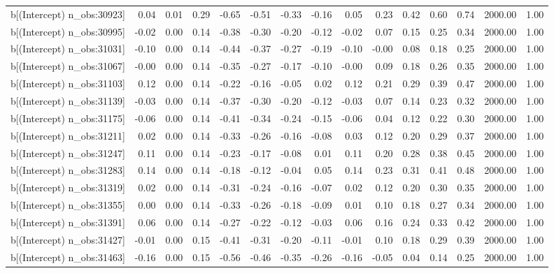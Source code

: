 \begin{table}[ht]
\begin{tabular}{rrrrrrrrrrrrrrr}
  b[(Intercept) n\_obs:30923] & 0.04 & 0.01 & 0.29 & -0.65 & -0.51 & -0.33 & -0.16 & 0.05 & 0.23 & 0.42 & 0.60 & 0.74 & 2000.00 & 1.00 \\ 
  b[(Intercept) n\_obs:30995] & -0.02 & 0.00 & 0.14 & -0.38 & -0.30 & -0.20 & -0.12 & -0.02 & 0.07 & 0.15 & 0.25 & 0.34 & 2000.00 & 1.00 \\ 
  b[(Intercept) n\_obs:31031] & -0.10 & 0.00 & 0.14 & -0.44 & -0.37 & -0.27 & -0.19 & -0.10 & -0.00 & 0.08 & 0.18 & 0.25 & 2000.00 & 1.00 \\ 
  b[(Intercept) n\_obs:31067] & -0.00 & 0.00 & 0.14 & -0.35 & -0.27 & -0.17 & -0.10 & -0.00 & 0.09 & 0.18 & 0.26 & 0.35 & 2000.00 & 1.00 \\ 
  b[(Intercept) n\_obs:31103] & 0.12 & 0.00 & 0.14 & -0.22 & -0.16 & -0.05 & 0.02 & 0.12 & 0.21 & 0.29 & 0.39 & 0.47 & 2000.00 & 1.00 \\ 
  b[(Intercept) n\_obs:31139] & -0.03 & 0.00 & 0.14 & -0.37 & -0.30 & -0.20 & -0.12 & -0.03 & 0.07 & 0.14 & 0.23 & 0.32 & 2000.00 & 1.00 \\ 
  b[(Intercept) n\_obs:31175] & -0.06 & 0.00 & 0.14 & -0.41 & -0.34 & -0.24 & -0.15 & -0.06 & 0.04 & 0.12 & 0.22 & 0.30 & 2000.00 & 1.00 \\ 
  b[(Intercept) n\_obs:31211] & 0.02 & 0.00 & 0.14 & -0.33 & -0.26 & -0.16 & -0.08 & 0.03 & 0.12 & 0.20 & 0.29 & 0.37 & 2000.00 & 1.00 \\ 
  b[(Intercept) n\_obs:31247] & 0.11 & 0.00 & 0.14 & -0.23 & -0.17 & -0.08 & 0.01 & 0.11 & 0.20 & 0.28 & 0.38 & 0.45 & 2000.00 & 1.00 \\ 
  b[(Intercept) n\_obs:31283] & 0.14 & 0.00 & 0.14 & -0.18 & -0.12 & -0.04 & 0.05 & 0.14 & 0.23 & 0.31 & 0.41 & 0.48 & 2000.00 & 1.00 \\ 
  b[(Intercept) n\_obs:31319] & 0.02 & 0.00 & 0.14 & -0.31 & -0.24 & -0.16 & -0.07 & 0.02 & 0.12 & 0.20 & 0.30 & 0.35 & 2000.00 & 1.00 \\ 
  b[(Intercept) n\_obs:31355] & 0.00 & 0.00 & 0.14 & -0.33 & -0.26 & -0.18 & -0.09 & 0.01 & 0.10 & 0.18 & 0.27 & 0.34 & 2000.00 & 1.00 \\ 
  b[(Intercept) n\_obs:31391] & 0.06 & 0.00 & 0.14 & -0.27 & -0.22 & -0.12 & -0.03 & 0.06 & 0.16 & 0.24 & 0.33 & 0.42 & 2000.00 & 1.00 \\ 
  b[(Intercept) n\_obs:31427] & -0.01 & 0.00 & 0.15 & -0.41 & -0.31 & -0.20 & -0.11 & -0.01 & 0.10 & 0.18 & 0.29 & 0.39 & 2000.00 & 1.00 \\ 
  b[(Intercept) n\_obs:31463] & -0.16 & 0.00 & 0.15 & -0.56 & -0.46 & -0.35 & -0.26 & -0.16 & -0.05 & 0.04 & 0.14 & 0.25 & 2000.00 & 1.00 \\ 

\end{tabular}
\end{table}
